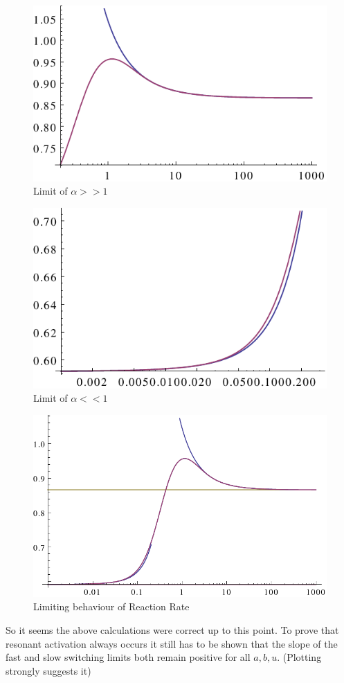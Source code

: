 \begin{minipage}[t]{0.5 \textwidth}
    \begin{figure}[H]
        \includegraphics[width = 1 \textwidth]{plots/largelimit.pdf}
    \caption{Limit of $\alpha >>1$}
    \end{figure}
\end{minipage}\begin{minipage}[t]{0.49 \textwidth}
    \begin{figure}[H]
        \includegraphics[width = 1 \textwidth]{plots/smalllimit.pdf}
    \caption{Limit of $\alpha <<1$}
    \end{figure}
\end{minipage}
\begin{figure}[H]
    \centering
    \includegraphics[width = 1 \textwidth]{plots/bothlimits.pdf}
    \caption{Limiting behaviour of Reaction Rate}
    \label{fig:rrlimit}
\end{figure}
So it seems the above calculations were correct up to this point. To prove that resonant activation always occurs it still has to be shown that the slope of the fast and slow switching limits both remain positive for all $a,b,u$. (Plotting strongly suggests it)
